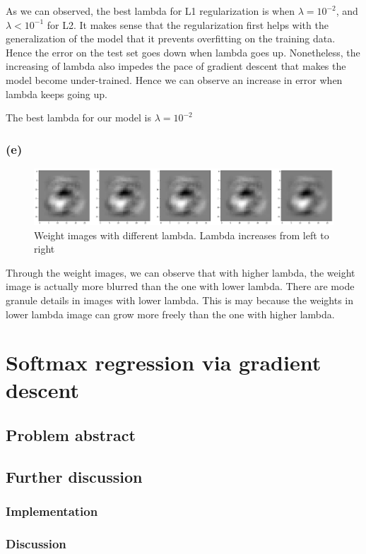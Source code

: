 \documentclass{article}
\begin{document}
As we can observed, the best lambda for L1 regularization is when $\lambda = 10^{-2}$, and $\lambda < 10^{-1}$ for L2. It makes sense that the regularization first helps with the generalization of the model that it prevents overfitting on the training data. Hence the error on the test set goes down when lambda goes up. Nonetheless, the increasing of lambda also impedes the pace of gradient descent that makes the model become under-trained. Hence we can observe an increase in error when lambda keeps going up.

The best lambda for our model is $\lambda=10^{-2}$ 
\subsubsection*{(e)}
\begin{figure}[h]
	\centering
	\includegraphics[width=\textwidth]{weight_img.png}
	\caption{Weight images with different lambda. Lambda increases from left to right}
\end{figure}
Through the weight images, we can observe that with higher lambda, the weight image is actually more blurred than the one with lower lambda. There are mode granule details in images with lower lambda. This is may because the weights in lower lambda image can grow more freely than the one with higher lambda.
\section{Softmax regression via gradient descent}
\subsection{Problem abstract}
\subsection{Further discussion}
\subsubsection{Implementation}
\subsubsection{Discussion}
\end{document}
